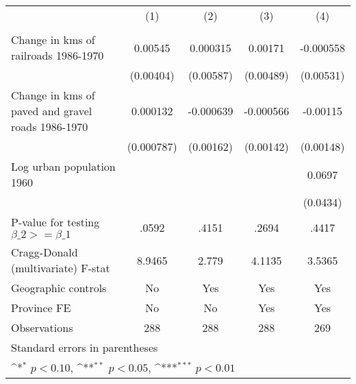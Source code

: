 {
\def\sym#1{\ifmmode^{#1}\else\(^{#1}\)\fi}
\begin{tabular}{l*{4}{c}}
\hline\hline
                &\multicolumn{1}{c}{(1)}&\multicolumn{1}{c}{(2)}&\multicolumn{1}{c}{(3)}&\multicolumn{1}{c}{(4)}\\
                &\multicolumn{1}{c}{}&\multicolumn{1}{c}{}&\multicolumn{1}{c}{}&\multicolumn{1}{c}{}\\
\hline
Change in kms of railroads 1986-1970&  0.00545         & 0.000315         &  0.00171         &-0.000558         \\
                &(0.00404)         &(0.00587)         &(0.00489)         &(0.00531)         \\
[1em]
Change in kms of paved and gravel roads 1986-1970& 0.000132         &-0.000639         &-0.000566         & -0.00115         \\
                &(0.000787)         &(0.00162)         &(0.00142)         &(0.00148)         \\
[1em]
Log urban population 1960&                  &                  &                  &   0.0697         \\
                &                  &                  &                  & (0.0434)         \\
\hline
P-value for testing $\beta\_{2} >= \beta\_{1}$&    .0592         &    .4151         &    .2694         &    .4417         \\
Cragg-Donald (multivariate) F-stat&   8.9465         &    2.779         &   4.1135         &   3.5365         \\
Geographic controls&       No         &      Yes         &      Yes         &      Yes         \\
Province FE     &       No         &       No         &      Yes         &      Yes         \\
Observations    &      288         &      288         &      288         &      269         \\
\hline\hline
\multicolumn{5}{l}{\footnotesize Standard errors in parentheses}\\
\multicolumn{5}{l}{\footnotesize \sym{*} \(p<0.10\), \sym{**} \(p<0.05\), \sym{***} \(p<0.01\)}\\
\end{tabular}
}
